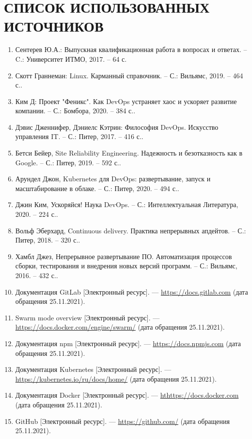 \section*{СПИСОК ИСПОЛЬЗОВАННЫХ ИСТОЧНИКОВ}

\begin{enumerate}
    \item Сентерев Ю.А.: Выпускная квалификационная работа в вопросах и ответах. – C.: Университет ИТМО, 2017. – 64 с.
    \item Скотт Граннеман: Linux. Карманный справочник. – С.: Вильямс, 2019. – 464 с..
    \item Ким Д: Проект "Феникс". Как DevOps устраняет хаос и ускоряет развитие компании. – С.: Бомбора, 2020. – 384 с..
    \item Дэвис Дженнифер, Дэниелс Кэтрин: Философия DevOps. Искусство управления IT. – С.: Питер, 2017. – 416 с..
    \item Бетси Бейер, Site Reliability Engineering. Надежность и безотказность как в Google. – С.: Питер, 2019. – 592 с..
    \item Арундел Джон, Kubernetes для DevOps: развертывание, запуск и масштабирование в облаке. – С.: Питер, 2020. – 494 с..
    \item Джин Ким, Ускоряйся! Наука DevOps. – С.: Интеллектуальная Литература, 2020. – 224 с..
    \item Вольф Эберхард, Continuous delivery. Практика непрерывных апдейтов. – С.: Питер, 2018. – 320 с..
    \item Хамбл Джез, Непрерывное развертывание ПО. Автоматизация процессов сборки, тестирования и внедрения новых версий программ. – С.: Вильямс, 2016. – 432 с..
    \item Документация GitLab [Электронный ресурс]. — \url{https://docs.gitlab.com} (дата обращения 25.11.2021).
    \item Swarm mode overview [Электронный ресурс]. — \url{https://docs.docker.com/engine/swarm/} (дата обращения 25.11.2021).
    \item Документация npm [Электронный ресурс]. — \url{https://docs.npmjs.com} (дата обращения 25.11.2021).
    \item Документация Kubernetes [Электронный ресурс]. — \url{https://kubernetes.io/ru/docs/home/} (дата обращения 25.11.2021).
    \item Документация Docker [Электронный ресурс]. — \url{hthttps://docs.docker.com} (дата обращения 25.11.2021).
    \item GitHub [Электронный ресурс]. — \url{https://github.com/} (дата обращения 25.11.2021).

\end{enumerate}

